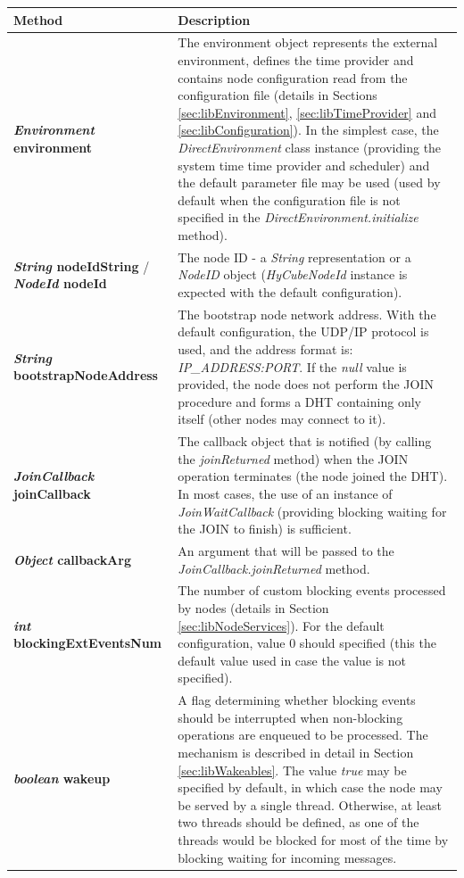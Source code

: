 \begin{table}[H]
\begin{center}
\scriptsize
\begin{tabular}{p{6.0cm} p{9.0cm}}
	\hline
	\textbf{Method}																& \textbf{Description}					\\[1mm]
    \hline
	\textbf{\emph{Environment} environment}										& The environment object represents the external environment, defines the time provider and contains node configuration read from the configuration file (details in Sections \ref{sec:libEnvironment}, \ref{sec:libTimeProvider} and \ref{sec:libConfiguration}). In the simplest case, the \emph{DirectEnvironment} class instance (providing the system time time provider and scheduler) and the default parameter file may be used (used by default when the configuration file is not specified in the \emph{DirectEnvironment.initialize} method).			\\[1.5mm]
	\textbf{\emph{String} nodeIdString} / \textbf{\emph{NodeId} nodeId}}		& The node ID - a \emph{String} representation or a \emph{NodeID} object (\emph{HyCubeNodeId} instance is expected with the default configuration).		\\[1.5mm]
	\textbf{\emph{String} bootstrapNodeAddress}									& The bootstrap node network address. With the default configuration, the UDP/IP protocol is used, and the address format is: \emph{IP\_ADDRESS:PORT}. If the \emph{null} value is provided, the node does not perform the JOIN procedure and forms a DHT containing only itself (other nodes may connect to it).			\\[1.5mm]
	\textbf{\emph{JoinCallback} joinCallback}									& The callback object that is notified (by calling the \emph{joinReturned} method) when the JOIN operation terminates (the node joined the DHT). In most cases, the use of an instance of \emph{JoinWaitCallback} (providing blocking waiting for the JOIN to finish) is sufficient.			\\[1.5mm]
	\textbf{\emph{Object} callbackArg}											& An argument that will be passed to the \emph{JoinCallback.joinReturned} method.			\\[1.5mm]
	\textbf{\emph{int} blockingExtEventsNum}									& The number of custom blocking events processed by nodes (details in Section \ref{sec:libNodeServices}). For the default configuration, value 0 should specified (this the default value used in case the value is not specified).			\\[1.5mm]
	\textbf{\emph{boolean} wakeup}												& A flag determining whether blocking events should be interrupted when non-blocking operations are enqueued to be processed. The mechanism is described in detail in Section \ref{sec:libWakeables}. The value \emph{true} may be specified by default, in which case the node may be served by a single thread. Otherwise, at least two threads should be defined, as one of the threads would be blocked for most of the time by blocking waiting for incoming messages.			\\[1.5mm]

\end{tabular}
\end{center}
\end{table}
